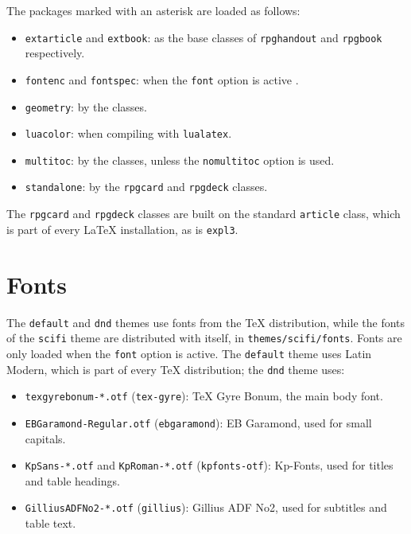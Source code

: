 	The packages marked with an asterisk are loaded as follows:
	\begin{itemize}
		\item \texttt{extarticle} and \texttt{extbook}: as the base classes of \texttt{rpghandout} and \texttt{rpgbook} respectively.
		\item \texttt{fontenc} and \texttt{fontspec}: when the \texttt{font} option is active .
		\item \texttt{geometry}: by the \rpgtex{} classes.
		\item \texttt{luacolor}: when compiling with \texttt{lualatex}.
		\item \texttt{multitoc}: by the \rpgtex{} classes, unless the \texttt{nomultitoc} option is used.
		\item \texttt{standalone}: by the \texttt{rpgcard} and \texttt{rpgdeck} classes.
	\end{itemize}
	The \texttt{rpgcard} and \texttt{rpgdeck} classes are built on the standard \texttt{article} class, which is part of every \LaTeX{} installation, as is \texttt{expl3}.

	\section{Fonts}

		The \texttt{default} and \texttt{dnd} themes use fonts from the \TeX{} distribution, while the fonts of the \texttt{scifi} theme are distributed with \rpgtex{} itself, in \texttt{themes/scifi/fonts}. Fonts are only loaded when the \texttt{font} option is active. The \texttt{default} theme uses Latin Modern, which is part of every \TeX{} distribution; the \texttt{dnd} theme uses:
		\begin{itemize}
			\item \texttt{texgyrebonum-*.otf} (\texttt{tex-gyre}): TeX Gyre Bonum, the main body font.
			\item \texttt{EBGaramond-Regular.otf} (\texttt{ebgaramond}): EB Garamond, used for small capitals.
			\item \texttt{KpSans-*.otf} and \texttt{KpRoman-*.otf} (\texttt{kpfonts-otf}): Kp-Fonts, used for titles and table headings.
			\item \texttt{GilliusADFNo2-*.otf} (\texttt{gillius}): Gillius ADF No2, used for subtitles and table text.
		\end{itemize}
